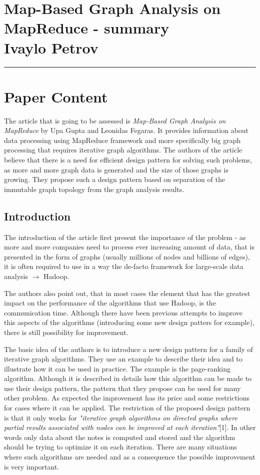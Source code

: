 \documentclass[12pt]{article}
\newcommand{\hr}{\rule{\linewidth}{0.1mm}}
\theoremstyle{plain}
\begin{document}
\section*{\centering
  Map-Based Graph Analysis on MapReduce - summary \\
  Ivaylo Petrov 
}

\hr

\section{Paper Content} %
\label{sec:Paper Content}
The article that is going to be assessed is \emph{Map-Based Graph Analysis on
MapReduce} by Upa Gupta and Leonidas Fegaras. It provides information about 
data processing using MapReduce framework and more specifically big graph 
processing that requires iterative graph algorithms. The authors of the article
believe that there is a need for efficient design pattern for solving such
problems, as more and more graph data is generated and the size of those
graphs is growing. They propose such a design pattern based on separation of
the immutable graph topology from the graph analysis results.

\subsection{Introduction} %
\label{sub:Introduction}
  The introduction of the article first present the importance of the problem - 
  as more and more companies need to process ever increasing amount of data,
  that is presented in the form of graphs (usually millions of nodes and
  billions of edges), it is often required to use in a way the de-facto
  framework for large-scale data analysis $\rightarrow$ Hadoop.

  The authors also point out, that in most cases the element that has the
  greatest impact on the performance of the algorithms that use Hadoop, is the
  communication time. Although there have been previous attempts to improve
  this aspects of the algorithms (introducing some new design patters for
  example), there is still possibility for improvement.

  The basic idea of the authors is to introduce a new design pattern for a 
  family of iterative graph algorithms. They use an example to describe their
  idea and to illustrate how it can be used in practice. The example is the
  page-ranking algorithm. Although it is described in details how this algorithm
  can be made to use their design pattern, the pattern that they propose can be
  used for many other problem. As expected the improvement has its price and 
  some restrictions for cases where it can be applied. The restriction of the
  proposed design pattern is that it only works for \emph{"iterative graph algorithms
  on directed graphs where partial results associated with nodes can be
  improved at each iteration"}[1]. In other words only data about the notes is
  computed and stored and the algorithm should be trying to optimize it on each
  iteration. There are many situations where such algorithms are needed and as
  a consequence the possible improvement is very important.
  
\end{document}
